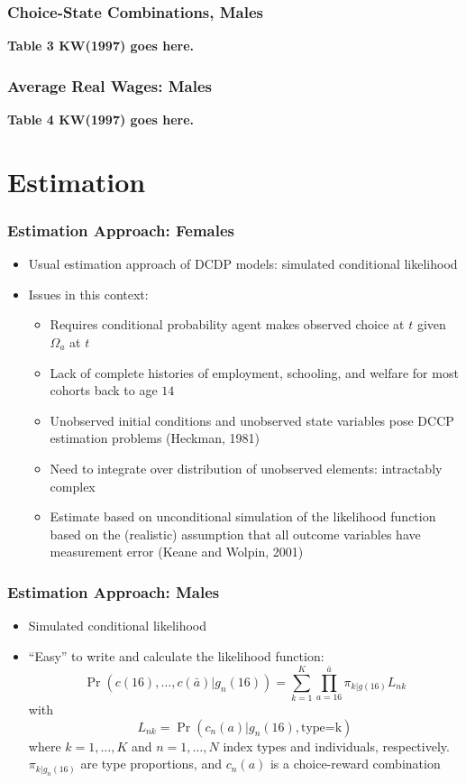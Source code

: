 \begin{frame}
	\frametitle{Choice-State Combinations, Males}
	\textbf{Table 3 KW(1997) goes here.}
\end{frame}

\begin{frame}
	\frametitle{Average Real Wages: Males}
	\textbf{Table 4 KW(1997) goes here.}
\end{frame}


\section{Estimation}

\begin{frame}
	\frametitle{Estimation Approach: Females}
		\begin{itemize}
			\item Usual estimation approach of DCDP models: simulated conditional likelihood
			\item Issues in this context:
				\begin{itemize}
					\item Requires conditional probability agent makes observed choice at $t$ given $\Omega_{a}$ at $t$
					\item Lack of complete histories of employment, schooling, and welfare for most cohorts back to age $14$
					\item Unobserved initial conditions and unobserved state variables pose DCCP estimation problems (Heckman, 1981)
					\item Need to integrate over distribution of unobserved elements: intractably complex
					\item Estimate based on unconditional simulation of the likelihood function based on the (realistic) assumption that all outcome variables have measurement error (Keane and Wolpin, 2001)
				\end{itemize}							
		\end{itemize}
\end{frame}

\begin{frame}
	\frametitle{Estimation Approach: Males}
		\begin{itemize}
			\item Simulated conditional likelihood
			\item ``Easy'' to write and calculate the likelihood function:
			\begin{equation}
				\Pr \left( c(16), \ldots, c(\bar{a})|g_{n}(16) \right) =
\sum \limits _{k=1} ^K \prod \limits _{a=16} ^{\bar{a}} \pi_{k|g(16)} L_{nk} \nonumber
			\end{equation}
\noindent with
\begin{equation}
L_{nk} = \Pr \left( c_{n}(a) | g_n(16), \text{type=k} \right)	\nonumber 
\end{equation}
\noindent where $k=1,\ldots,K$ and $n = 1, \ldots, N$ index types and individuals, respectively. $\pi_{k|g_{n}(16)}$ are type proportions, and $c_{n}(a)$ is a choice-reward combination
		\end{itemize}
\end{frame}

